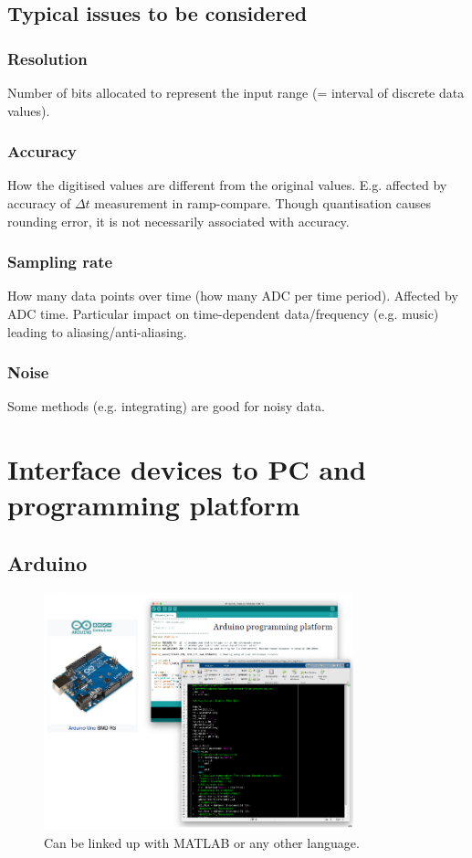 \documentclass[class=report, crop=false, 12pt,a4paper]{standalone}
\begin{document}
\subsection{Typical issues to be considered}
\subsubsection*{Resolution}
Number of bits allocated to represent the input range (= interval of discrete data values).
\subsubsection*{Accuracy}
How the digitised values are different from the original values. E.g. affected by accuracy of $\Delta t$ measurement in ramp-compare. Though quantisation causes rounding error, it is not necessarily associated with accuracy.
\subsubsection*{Sampling rate}
How many data points over time (how many ADC per time period). Affected by ADC time. Particular impact on time-dependent data/frequency (e.g. music) leading to aliasing/anti-aliasing.
\subsubsection*{Noise}
Some methods (e.g. integrating) are good for noisy data.
\section{Interface devices to PC and programming platform}
\subsection{Arduino}
\begin{figure}[H]
  \centering
  \includegraphics[width = 0.8\textwidth]{../img/diagram60.png}
  \caption{Can be linked up with MATLAB or any other language.}
\end{figure}
\end{document}
